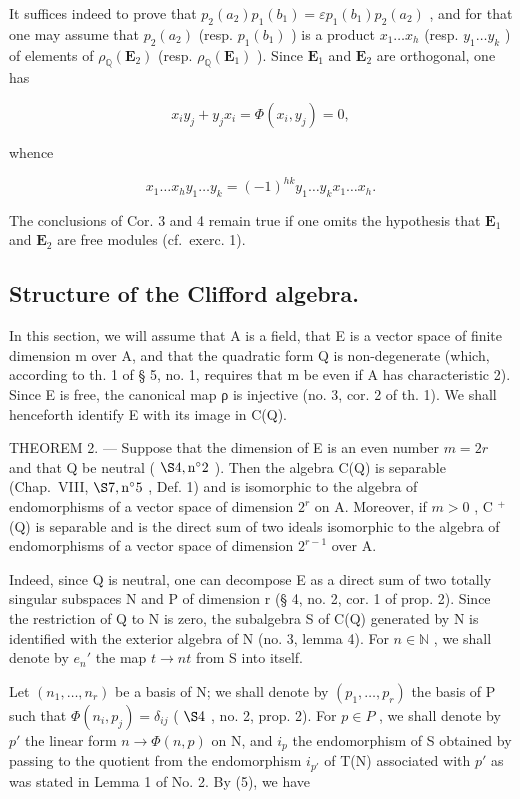 It suffices indeed to prove that \(p_2(a_2)p_1(b_1) = \varepsilon p_1(b_1)p_2(a_2)\) , and for that one may assume that \(p_2(a_2)\) (resp. \(p_1(b_1)\) ) is a product \(x_1 \ldots x_h\) (resp. \(y_1 \ldots y_k\) ) of elements of \(\rho_{\mathbb{Q}}(\mathbf{E}_2)\) (resp. \(\rho_{\mathbb{Q}}(\mathbf{E}_1)\) ). Since \(\mathbf{E}_1\) and \(\mathbf{E}_2\) are orthogonal, one has

\[
x _ {i} y _ {j} + y _ {j} x _ {i} = \Phi (x _ {i}, y _ {j}) = 0,
\]

whence

\[
x _ {1} \dots x _ {h} y _ {1} \dots y _ {k} = (- 1) ^ {h k} y _ {1} \dots y _ {k} x _ {1} \dots x _ {h}.
\]

The conclusions of Cor. 3 and 4 remain true if one omits the hypothesis that \(\mathbf{E}_1\) and \(\mathbf{E}_2\) are free modules (cf.~exerc. 1).

\subsection{Structure of the Clifford algebra.}

In this section, we will assume that A is a field, that E is a vector space of finite dimension m over A, and that the quadratic form Q is non-degenerate (which, according to th. 1 of § 5, no. 1, requires that m be even if A has characteristic 2). Since E is free, the canonical map ρ is injective (no. 3, cor. 2 of th. 1). We shall henceforth identify E with its image in C(Q).

THEOREM 2. --- Suppose that the dimension of E is an even number \(m = 2r\) and that Q be neutral ( \(\S 4, \text{n}^{\circ} 2\) ). Then the algebra C(Q) is separable (Chap.~VIII, \(\S 7, \text{n}^{\circ} 5\) , Def. 1) and is isomorphic to the algebra of endomorphisms of a vector space of dimension \(2^{r}\) on A. Moreover, if \(m > 0\) , C \(^{+}\) (Q) is separable and is the direct sum of two ideals isomorphic to the algebra of endomorphisms of a vector space of dimension \(2^{r-1}\) over A.

Indeed, since Q is neutral, one can decompose E as a direct sum of two totally singular subspaces N and P of dimension r (§ 4, no. 2, cor. 1 of prop. 2). Since the restriction of Q to N is zero, the subalgebra S of C(Q) generated by N is identified with the exterior algebra of N (no. 3, lemma 4). For \(n \in \mathbb{N}\) , we shall denote by \(e_n'\) the map \(t \to nt\) from S into itself.

Let \((n_{1},\ldots,n_{r})\) be a basis of N; we shall denote by \((p_{1},\ldots,p_{r})\) the basis of P such that \(\Phi(n_{i},p_{j})=\delta_{ij}\) ( \(\S 4\) , no. 2, prop. 2). For \(p\in P\) , we shall denote by \(p'\) the linear form \(n\to\Phi(n,p)\) on N, and \(i_{p}\) the endomorphism of S obtained by passing to the quotient from the endomorphism \(i_{p'}\) of T(N) associated with \(p'\) as was stated in Lemma 1 of No. 2. By (5), we have

